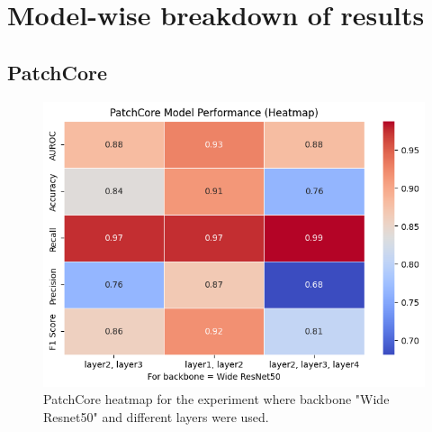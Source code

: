 \section{Model-wise breakdown of results}

\subsection*{PatchCore}

\begin{figure}[H]
    \centering
    \includegraphics[width=1\linewidth]{Rohit_Master_Thesis//Images/patchcore heatmap.png}
    \caption{PatchCore heatmap for the experiment where backbone "Wide Resnet50" and different layers were used.}
    \label{fig:patchcore heatmap}
\end{figure}

